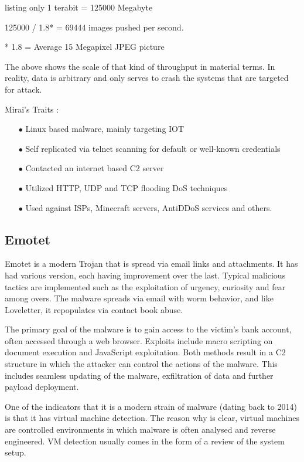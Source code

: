 \begin{tcblisting}{listing only}
1 terabit = 125000 Megabyte

125000 / 1.8* = 69444 images pushed per second. 
\end{tcblisting}

\small{* 1.8 = Average 15 Megapixel JPEG picture \citep{imgAvg}}

The above shows the scale of that kind of throughput in material terms. In reality, data is arbitrary and only serves to crash the systems that are targeted for attack.

Mirai's Traits \citep{Mirai}:
\begin{enumerate}
    \item [$\bullet$] Linux based malware, mainly targeting IOT
    \item [$\bullet$] Self replicated via telnet scanning for default or well-known credentials
    \item [$\bullet$] Contacted an internet based C2 server
    \item [$\bullet$] Utilized HTTP, UDP and TCP flooding DoS techniques
    \item [$\bullet$] Used against ISPs, Minecraft servers, AntiDDoS services and others.
\end{enumerate}

\subsection{Emotet}
Emotet is a modern Trojan that is spread via email links and attachments. It has had various version, each having improvement over the last. Typical malicious tactics are implemented such as the exploitation of urgency, curiosity and fear among overs. The malware spreads via email with worm behavior, and like Loveletter, it repopulates via contact book abuse. \citep{Emotet}

The primary goal of the malware is to gain access to the victim's bank account, often accessed through a web browser. Exploits include macro scripting on document execution and JavaScript exploitation. Both methods result in a C2 structure in which the attacker can control the actions of the malware. This includes seamless updating of the malware, exfiltration of data and further payload deployment. \citep{Emotet}

One of the indicators that it is a modern strain of malware (dating back to 2014) is that it has virtual machine detection. \citep{Emotet} The reason why is clear, virtual machines are controlled environments in which malware is often analysed and reverse engineered. VM detection usually comes in the form of a review of the system setup. 

